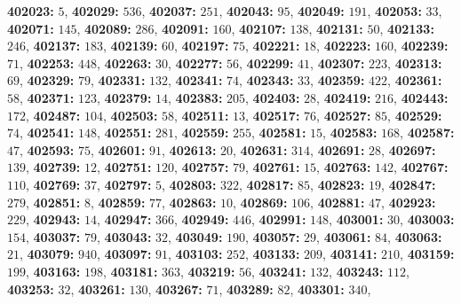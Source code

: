 \textsf{\bfseries 402023:} $5$, \textsf{\bfseries 402029:} $536$, \textsf{\bfseries 402037:} $251$, \textsf{\bfseries 402043:} $95$, \textsf{\bfseries 402049:} $191$, \textsf{\bfseries 402053:} $33$, \textsf{\bfseries 402071:} $145$, \textsf{\bfseries 402089:} $286$, \textsf{\bfseries 402091:} $160$, \textsf{\bfseries 402107:} $138$, \textsf{\bfseries 402131:} $50$, \textsf{\bfseries 402133:} $246$, \textsf{\bfseries 402137:} $183$, \textsf{\bfseries 402139:} $60$, \textsf{\bfseries 402197:} $75$, \textsf{\bfseries 402221:} $18$, \textsf{\bfseries 402223:} $160$, \textsf{\bfseries 402239:} $71$, \textsf{\bfseries 402253:} $448$, \textsf{\bfseries 402263:} $30$, \textsf{\bfseries 402277:} $56$, \textsf{\bfseries 402299:} $41$, \textsf{\bfseries 402307:} $223$, \textsf{\bfseries 402313:} $69$, \textsf{\bfseries 402329:} $79$, \textsf{\bfseries 402331:} $132$, \textsf{\bfseries 402341:} $74$, \textsf{\bfseries 402343:} $33$, \textsf{\bfseries 402359:} $422$, \textsf{\bfseries 402361:} $58$, \textsf{\bfseries 402371:} $123$, \textsf{\bfseries 402379:} $14$, \textsf{\bfseries 402383:} $205$, \textsf{\bfseries 402403:} $28$, \textsf{\bfseries 402419:} $216$, \textsf{\bfseries 402443:} $172$, \textsf{\bfseries 402487:} $104$, \textsf{\bfseries 402503:} $58$, \textsf{\bfseries 402511:} $13$, \textsf{\bfseries 402517:} $76$, \textsf{\bfseries 402527:} $85$, \textsf{\bfseries 402529:} $74$, \textsf{\bfseries 402541:} $148$, \textsf{\bfseries 402551:} $281$, \textsf{\bfseries 402559:} $255$, \textsf{\bfseries 402581:} $15$, \textsf{\bfseries 402583:} $168$, \textsf{\bfseries 402587:} $47$, \textsf{\bfseries 402593:} $75$, \textsf{\bfseries 402601:} $91$, \textsf{\bfseries 402613:} $20$, \textsf{\bfseries 402631:} $314$, \textsf{\bfseries 402691:} $28$, \textsf{\bfseries 402697:} $139$, \textsf{\bfseries 402739:} $12$, \textsf{\bfseries 402751:} $120$, \textsf{\bfseries 402757:} $79$, \textsf{\bfseries 402761:} $15$, \textsf{\bfseries 402763:} $142$, \textsf{\bfseries 402767:} $110$, \textsf{\bfseries 402769:} $37$, \textsf{\bfseries 402797:} $5$, \textsf{\bfseries 402803:} $322$, \textsf{\bfseries 402817:} $85$, \textsf{\bfseries 402823:} $19$, \textsf{\bfseries 402847:} $279$, \textsf{\bfseries 402851:} $8$, \textsf{\bfseries 402859:} $77$, \textsf{\bfseries 402863:} $10$, \textsf{\bfseries 402869:} $106$, \textsf{\bfseries 402881:} $47$, \textsf{\bfseries 402923:} $229$, \textsf{\bfseries 402943:} $14$, \textsf{\bfseries 402947:} $366$, \textsf{\bfseries 402949:} $446$, \textsf{\bfseries 402991:} $148$, \textsf{\bfseries 403001:} $30$, \textsf{\bfseries 403003:} $154$, \textsf{\bfseries 403037:} $79$, \textsf{\bfseries 403043:} $32$, \textsf{\bfseries 403049:} $190$, \textsf{\bfseries 403057:} $29$, \textsf{\bfseries 403061:} $84$, \textsf{\bfseries 403063:} $21$, \textsf{\bfseries 403079:} $940$, \textsf{\bfseries 403097:} $91$, \textsf{\bfseries 403103:} $252$, \textsf{\bfseries 403133:} $209$, \textsf{\bfseries 403141:} $210$, \textsf{\bfseries 403159:} $199$, \textsf{\bfseries 403163:} $198$, \textsf{\bfseries 403181:} $363$, \textsf{\bfseries 403219:} $56$, \textsf{\bfseries 403241:} $132$, \textsf{\bfseries 403243:} $112$, \textsf{\bfseries 403253:} $32$, \textsf{\bfseries 403261:} $130$, \textsf{\bfseries 403267:} $71$, \textsf{\bfseries 403289:} $82$, \textsf{\bfseries 403301:} $340$, 
